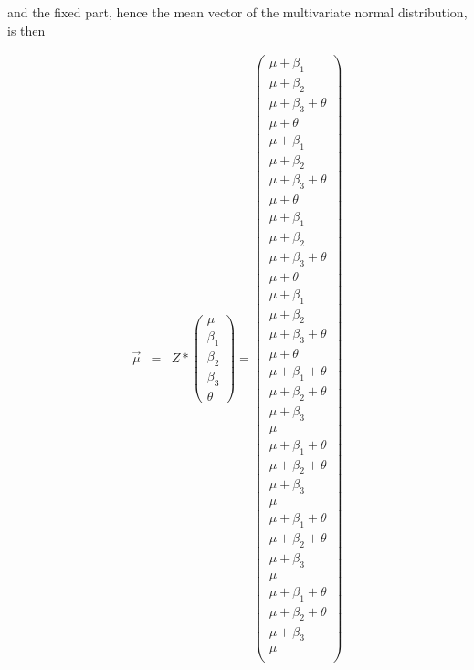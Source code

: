 \documentclass{article}
\begin{document}
and the fixed part, hence the mean vector of the multivariate normal distribution, is then

\begin{eqnarray*}
\overrightarrow{\mu}
&=&  Z*
\left(\begin{array}{ccc}
 \mu	\\
 \beta_{1}	\\
 \beta_{2}	\\
 \beta_{3}  \\
 \theta
 \end{array}\right) 
=
 \left(
 \begin{array}{c}
 \mu +\beta_{1}	 \\
  \mu	+\beta_{2}	\\
  \mu  +\beta_{3}	+\theta\\
  \mu	 +\theta\\
  \mu +\beta_{1}	 \\
  \mu	+\beta_{2}	\\
  \mu  +\beta_{3}	+\theta\\
  \mu	 +\theta\\
  \mu +\beta_{1}   \\
  \mu	+\beta_{2}	\\
  \mu  +\beta_{3}	+\theta\\
  \mu	 +\theta\\
  \mu +\beta_{1}	 \\
  \mu	+\beta_{2}	\\
  \mu  +\beta_{3}	+\theta\\
  \mu	 +\theta\\ 
    \mu	+\beta_{1}	+\theta\\
     \mu	+\beta_{2}	+\theta \\
     \mu  +\beta_{3}	\\
      \mu	 \\
      \mu	+\beta_{1}	+\theta\\
     \mu	+\beta_{2}	+\theta  \\
     \mu  +\beta_{3}	\\
      \mu	 \\ 
      \mu  +\beta_{1}	+\theta\\
     \mu	+\beta_{2}	+\theta \\
     \mu  +\beta_{3}	\\
      \mu	 \\
      \mu	+\beta_{1}	+\theta\\
     \mu	+\beta_{2}	+\theta  \\
     \mu  +\beta_{3}	\\
      \mu	 \\ 
 \end{array}\right) 
\end{eqnarray*}
\end{document}
